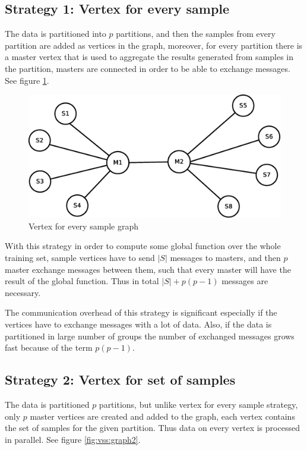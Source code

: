 \documentclass{report}
\begin{document}
\subsection{Strategy 1: Vertex for every sample}

The data is partitioned into $p$ partitions, and then the samples from every partition are added as vertices in the graph, moreover, for every partition there is a master vertex that is used to aggregate the results generated from samples in the partition, masters are connected in order to be able to exchange messages. See figure \ref{fig:vs:graph1}.

\begin{figure}[!htb]
  \centering
  \includegraphics*[scale=0.45]{graph1.eps}
  \caption{Vertex for every sample graph}
  \label{fig:vs:graph1}
\end{figure}

With this strategy in order to compute some global function over the whole training set, sample vertices have to send $|S|$ messages to masters, and then $p$  master exchange messages between them, such that every master will have the result of the global function. Thus in total $|S| + p(p-1)$ messages are necessary.

The communication overhead of this strategy is significant especially if the vertices have to exchange messages with a lot of data. Also, if the data is partitioned in large number of groups the number of exchanged messages grows fast because of the term $p(p-1)$.

\subsection{Strategy 2: Vertex for set of samples}

The data is partitioned $p$ partitions, but unlike vertex for every sample strategy, only $p$ master vertices are created and added to the graph, each vertex contains the set of samples for the given partition. Thus data on every vertex is processed in parallel. See figure \ref{fig:vss:graph2}.
\end{document}
